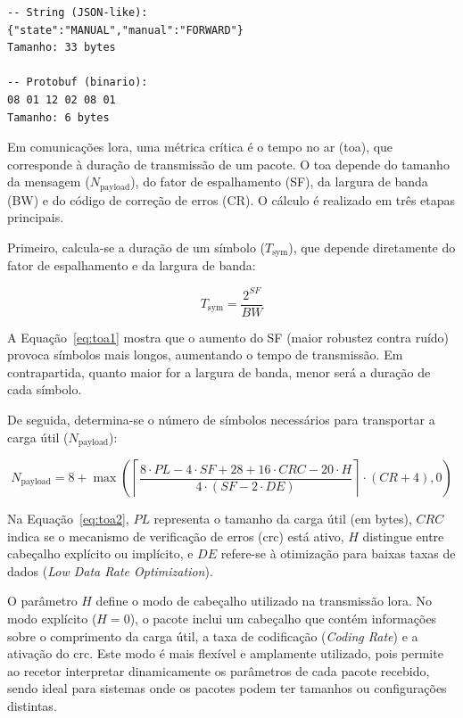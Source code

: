 \begin{lstlisting}[style={BetterCPP},caption={Comparação entre representação textual e binária com \texttt{Protobuf}},label={lst:comp}]
-- String (JSON-like):
{"state":"MANUAL","manual":"FORWARD"}
Tamanho: 33 bytes

-- Protobuf (binario):
08 01 12 02 08 01
Tamanho: 6 bytes
\end{lstlisting}

Em comunicações \gls{lora}, uma métrica crítica é o tempo no ar (\gls{toa}), que corresponde à duração de transmissão de um pacote. O \gls{toa} depende do tamanho da mensagem ($N_{\text{payload}}$), do fator de espalhamento (SF), da largura de banda (BW) e do código de correção de erros (CR). O cálculo é realizado em três etapas principais.  

Primeiro, calcula-se a duração de um símbolo ($T_{\text{sym}}$), que depende diretamente do fator de espalhamento e da largura de banda:

\begin{equation}
T_{\text{sym}} = \frac{2^{SF}}{BW}
\label{eq:toa1}
\end{equation}

A Equação~\ref{eq:toa1} mostra que o aumento do SF (maior robustez contra ruído) provoca símbolos mais longos, aumentando o tempo de transmissão. Em contrapartida, quanto maior for a largura de banda, menor será a duração de cada símbolo.  

De seguida, determina-se o número de símbolos necessários para transportar a carga útil ($N_{\text{payload}}$):

\begin{equation}
N_{\text{payload}} = 8 + \max \left( \left\lceil \frac{8 \cdot PL - 4 \cdot SF + 28 + 16 \cdot CRC - 20 \cdot H}{4 \cdot (SF - 2 \cdot DE)} \right\rceil \cdot (CR+4), 0 \right)
\label{eq:toa2}
\end{equation}

Na Equação~\ref{eq:toa2}, $PL$ representa o tamanho da carga útil (em bytes), $CRC$ indica se o mecanismo de verificação de erros (\gls{crc}) está ativo, $H$ distingue entre cabeçalho explícito ou implícito, e $DE$ refere-se à otimização para baixas taxas de dados (\emph{Low Data Rate Optimization}).  

O parâmetro $H$ define o modo de cabeçalho utilizado na transmissão \gls{lora}.  
No modo explícito ($H = 0$), o pacote inclui um cabeçalho que contém informações sobre o comprimento da carga útil, a taxa de codificação (\emph{Coding Rate}) e a ativação do \gls{crc}. Este modo é mais flexível e amplamente utilizado, pois permite ao recetor interpretar dinamicamente os parâmetros de cada pacote recebido, sendo ideal para sistemas onde os pacotes podem ter tamanhos ou configurações distintas.  

